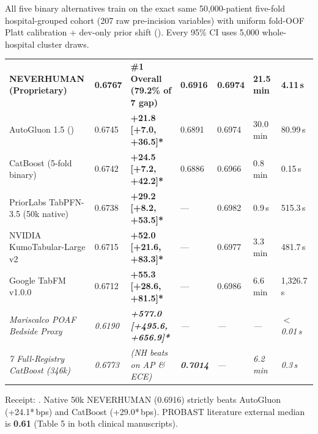\documentclass[10pt,letterpaper]{article}
\begin{document}
\vspace{4.5pt}

{\noindent\fontsize{7.7}{9.5}\selectfont All five binary alternatives train on the exact same 50,000-patient five-fold hospital-grouped cohort (207 raw pre-incision variables) with uniform fold-OOF Platt calibration + dev-only prior shift (). Every 95\% CI uses 5,000 whole-hospital cluster draws.\par}

\vspace{2.5pt}
\noindent
{\fontsize{7.1}{8.8}\selectfont\setlength{\tabcolsep}{2.7pt}
\begin{tabularx}{\textwidth}{@{}Y R{1.15cm} R{2.45cm} R{1.10cm} R{1.10cm} R{1.25cm} R{1.25cm}@{}}
\toprule
{} &  &  &  &  &  &  \\
\midrule
{}
\textbf{NEVERHUMAN (Proprietary)} & \textbf{0.6767} & \textbf{\#1 Overall (79.2\% of 7\x{} gap)} & \textbf{0.6916} & \textbf{0.6974} & \textbf{21.5\,min} & \textbf{4.11\,s} \\
AutoGluon 1.5 () & 0.6745 & \textbf{+21.8 [+7.0, +36.5]*} & 0.6891 & 0.6974 & 30.0\,min & 80.99\,s \\
CatBoost (5-fold binary) & 0.6742 & \textbf{+24.5 [+7.2, +42.2]*} & 0.6886 & 0.6966 & 0.8\,min & 0.15\,s \\
PriorLabs TabPFN-3.5 (50k native) & 0.6738 & \textbf{+29.2 [+8.2, +53.5]*} & --- & 0.6982 & 0.9\,s & 515.3\,s \\
NVIDIA KumoTabular-Large v2 & 0.6715 & \textbf{+52.0 [+21.6, +83.3]*} & --- & 0.6977 & 3.3\,min & 481.7\,s \\
Google TabFM v1.0.0 & 0.6712 & \textbf{+55.3 [+28.6, +81.5]*} & --- & 0.6986 & 6.6\,min & 1,326.7\,s \\
\midrule
\textit{Mariscalco POAF Bedside Proxy} & \textit{0.6190} & \textit{\textbf{+577.0 [+495.6, +656.9]*}} & \textit{---} & \textit{---} & \textit{---} & \textit{$<$0.01\,s} \\
\textit{7\x{} Full-Registry CatBoost (346k)} & \textit{0.6773} & \textit{ (NH beats on AP \& ECE)} & \textit{\textbf{0.7014}} & \textit{---} & \textit{6.2\,min} & \textit{0.3\,s} \\
\bottomrule
\end{tabularx}}
\vspace{1.2pt}
{\noindent\sffamily\fontsize{6.2}{7.6}\selectfont\color{sub}Receipt: . Native 50k  NEVERHUMAN (0.6916) strictly beats AutoGluon  (+24.1*\,bps) and CatBoost  (+29.0*\,bps). PROBAST literature external median is \textbf{0.61} (Table 5 in both clinical manuscripts).\par}
\end{document}
